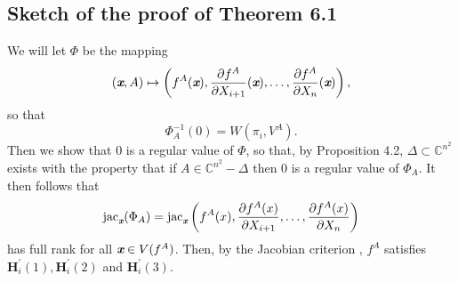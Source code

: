 \documentclass[sigconf]{acmart}
\def\xb{\textit{\textbf{x}}}
\def\C{\mathbb{C}}
\def\jac{ \textrm{jac}}
\def\pa{\partial}
\begin{document}
\subsection{Sketch of the proof of Theorem 6.1}
%
We will let $\Phi$ be the mapping 
\[
(\xb,A) \mapsto \left(f^A(\xb), \frac{\partial f^A}{\partial X_{i+1}}(\xb),\hdots,\frac{\partial f^A}{\partial X_n}(\xb)\right),
\] 
so that 
\[
\Phi_A^{-1}(0)= W(\pi_i,V^A).
\]
Then we show that $0$ is a regular value of $\Phi$, so that, by Proposition 4.2, $\Delta \subset \C^{n^2}$ exists with the property that if $A \in \C^{n^2}-\Delta$ then $0$ is a regular value of $\Phi_A.$ It then follows that 
\[
\jac_{\xb}(\Phi_A) = \jac_{\xb}\left(f^A(x),\frac{\pa f^A(x)}{\pa X_{i+1}},\hdots,\frac{\pa f^A(x)}{\pa X_n}\right)
\]
has full rank for all $\xb \in V(f^A)$. Then, by the Jacobian criterion \cite[Theorem 16.19]{ECA}, $f^A$ satisfies $\textbf{H}_i^{'}(1),\textbf{H}_i^{'}(2)$ and $\textbf{H}_i^{'}(3)$.
\end{document}
